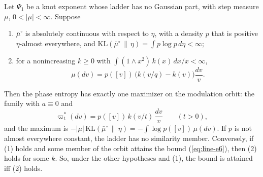 \begin{theorem}
\label{thm:phase-entropy-modulated-selection}

Let $\Psi_1$ be a knot exponent whose ladder has no Gaussian part, with step measure $\mu$,
$0 < |\mu| < \infty$. Suppose
\begin{enumerate}
\item $\bar\mu^\circ$ is absolutely continuous with respect to $\eta$, with a density $p$ that is
positive $\eta$-almost everywhere, and
$\mathrm{KL}(\bar\mu^\circ \,\|\, \eta) = \int p\log p\,d\eta < \infty$;
\item for a nonincreasing $k \ge 0$ with $\int(1 \wedge x^2)\,k(x)\,dx/x < \infty$,
\[
  \mu(dv) = p([v])\,\bigl(k(v/q) - k(v)\bigr)\frac{dv}{v}.
\]
\end{enumerate}
Then the phase entropy has exactly one maximizer on the modulation orbit: the family with
$a \equiv 0$ and
\[
  \varpi^*_t(dv) = p([v])\,k(v/t)\,\frac{dv}{v} \qquad (t > 0),
\]
and the maximum is
$-|\mu|\,\mathrm{KL}(\bar\mu^\circ \,\|\, \eta) = -\int\log p([v])\,\mu(dv)$. If $p$ is not
almost everywhere constant, the ladder has no similarity member.
Conversely, if (1) holds and some member of the orbit attains the bound (\ref{eq:line-e6}), then
(2) holds for some $k$. So, under the other hypotheses and (1), the bound is attained iff (2)
holds.
\end{theorem}

